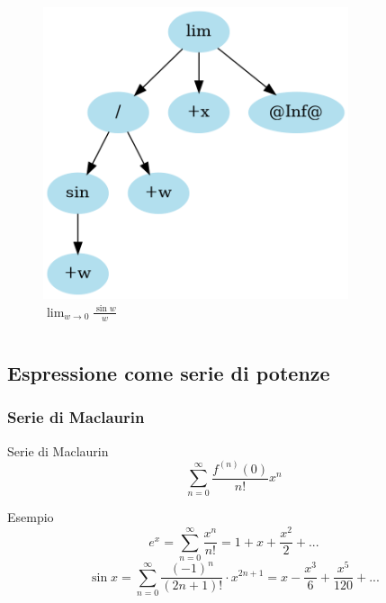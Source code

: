 \documentclass[aspectratio=149]{beamer}
\begin{document}
\begin{frame}
\begin{columns}
\begin{column}{0.45\textwidth}
\begin{figure}
					\includegraphics[width=0.8\textwidth]{pres_img/replaced2.png}
					\caption{\(\lim_{w \to 0}{\frac{\sin{w}}{w}}\)}
				\end{figure}
			\end{column}
		\end{columns}
	\end{frame}

	\subsection{Espressione come serie di potenze}
	
	\begin{frame}
		\frametitle{Serie di Maclaurin}
		\begin{block}{Serie di Maclaurin}
			\[
			\sum_{n=0}^{\infty}{\frac{f^{(n)}(0)}{n!} x^{n}}
			\] 
		\end{block}
		\begin{exampleblock}{Esempio}
			\[
				e^{x} = \sum_{n=0}^{\infty} \frac{x^{n}}{n!} = 1 + x + \frac{x^2}{2} + ...
			\]
			\[
				\sin{x} = \sum_{n=0}^{\infty} \frac{(-1)^{n}}{(2n + 1)!} \cdot x^{2n+1} = x - \frac{x^3}{6} + \frac{x^5}{120} + ...
			\]
		\end{exampleblock}
	\end{frame}
	
\end{document}
